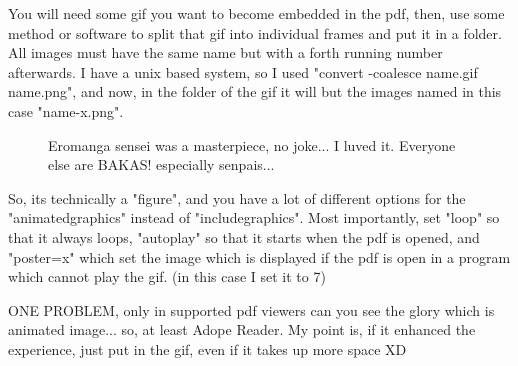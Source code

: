 You will need some gif you want to become embedded in the pdf, then, use some method or software to split
that gif into individual frames and put it in a folder. All images must have the same name but with a forth running number afterwards.
I have a unix based system, so I used "convert -coalesce name.gif name.png", and now, in the folder of the gif it will but the images
named in this case "name-x.png".
\begin{figure}[H]
	\centering
	\caption{Eromanga sensei was a masterpiece, no joke... I luved it. Everyone else are BAKAS! especially senpais...}
	\label{gif:eromanga_sensei}
\end{figure}
So, its technically a "figure", and you have a lot of different options for the "animatedgraphics" instead of "includegraphics".
Most importantly, set "loop" so that it always loops, "autoplay" so that it starts when the pdf is opened, and "poster=x" which
set the image which is displayed if the pdf is open in a program which cannot play the gif. (in this case I set it to 7)

ONE PROBLEM, only in supported pdf viewers can you see the glory which is animated image... so, at least Adope Reader.
My point is, if it enhanced the experience, just put in the gif, even if it takes up more space XD